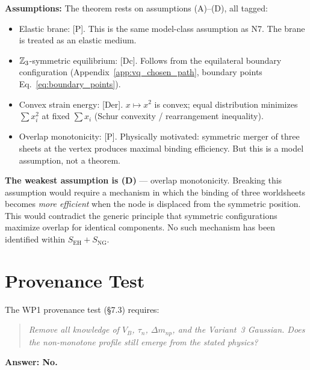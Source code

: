 \textbf{Assumptions:}
The theorem rests on assumptions (A)--(D), all tagged:
\begin{itemize}
    \item[(A)] Elastic brane: [P]. This is the same model-class
          assumption as N7. The brane is treated as an elastic medium.
    \item[(B)] $\mathbb{Z}_3$-symmetric equilibrium: [Dc]. Follows from the
          equilateral boundary configuration
          (Appendix~\ref{app:vq_chosen_path}, boundary points
          Eq.~\eqref{eq:boundary_points}).
    \item[(C)] Convex strain energy: [Der]. $x \mapsto x^2$ is convex;
          equal distribution minimizes $\sum x_i^2$ at fixed $\sum x_i$
          (Schur convexity / rearrangement inequality).
    \item[(D)] Overlap monotonicity: [P]. Physically motivated: symmetric
          merger of three sheets at the vertex produces maximal binding
          efficiency. But this is a model assumption, not a theorem.
\end{itemize}

\textbf{The weakest assumption is (D)} --- overlap monotonicity.
Breaking this assumption would require a mechanism in which the
binding of three worldsheets becomes \emph{more efficient} when the
node is displaced from the symmetric position. This would contradict
the generic principle that symmetric configurations maximize overlap
for identical components. No such mechanism has been identified within
$S_{\mathrm{EH}} + S_{\mathrm{NG}}$.

\section{Provenance Test}
\label{sec:NMCP:provenance}

The WP1 provenance test (\S7.3) requires:

\begin{quote}
\emph{Remove all knowledge of $V_B$, $\tau_n$, $\Delta m_{np}$, and
the Variant~3 Gaussian. Does the non-monotone profile still emerge
from the stated physics?}
\end{quote}

\textbf{Answer: No.}

